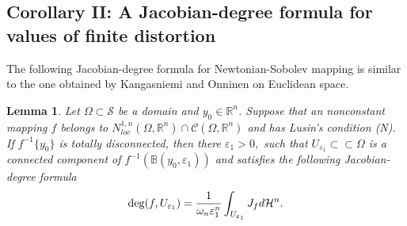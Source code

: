 \documentclass[11pt,twoside]{article}
\newtheorem{lem}[thm]{Lemma}
\theoremstyle{definition}
\theoremstyle{remark}
\begin{document}
\subsection{Corollary II: A Jacobian-degree formula for values of finite distortion} 
The following Jacobian-degree formula for Newtonian-Sobolev mapping is similar to the one obtained by Kangasniemi and  Onninen \cite{KO222} on Euclidean space. 
\begin{lem}\label{lomlm}
Let  $\Omega\subset\mathcal{S}$ be a domain and $y_{0}\in\mathbb{R}^{n}$. Suppose that an nonconstant mapping $f$ belongs to  $N_{loc}^{1,n}(\Omega,\mathbb{R}^{n})\cap \mathcal{C}(\Omega,\mathbb{R}^{n})$ and has Lusin's condition (N). If $f^{-1}\{y_{0}\}$ is totally disconnected, then there $\varepsilon_{1}>0,$ such that $U_{\varepsilon_{1}}\subset\subset\Omega$ is a connected component of $f^{-1}(\mathbb{B}(y_{0},\varepsilon_{1}))$ and satisfies the following Jacobian-degree formula
\begin{equation}
{\rm deg}(f,U_{\varepsilon_{1}})=\frac{1}{\omega_{n}\varepsilon_{1}^{n}}\int_{U_{\varepsilon_{1}}}J_{f}d\mathcal{H}^{n}.
\end{equation}
\end{lem}
\end{document}
